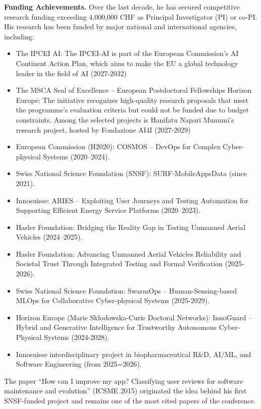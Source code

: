 \documentclass[11pt]{article}
\begin{document}
\medskip
\noindent
\textbf{Funding Achievements.}
Over the last decade, he has secured competitive research funding exceeding 4,000,000 CHF as Principal Investigator (PI) or co-PI. His research has been funded by major national and international agencies, including:

\begin{itemize}
\item The IPCEI AI: The IPCEI-AI is part of the European Commission's AI Continent Action Plan, which aims to make the EU a global technology leader in the field of AI (2027-2032) 
\item The MSCA Seal of Excellence – European Postdoctoral Fellowships Horizon Europe: The initiative recognizes high-quality research proposals that meet the programme’s evaluation criteria but could not be funded due to budget constraints. Among the selected projects is Hanifatu Napari Mumuni’s research project, hosted by Fondazione AI4I  (2027-2029) 
\item European Commission (H2020): COSMOS – DevOps for Complex Cyber-physical Systems (2020–2024).
\item Swiss National Science Foundation (SNSF): SURF-MobileAppsData (since 2021).
\item Innosuisse: ARIES – Exploiting User Journeys and Testing Automation for Supporting Efficient Energy Service Platforms (2020–2023).
\item Hasler Foundation: Bridging the Reality Gap in Testing Unmanned Aerial Vehicles (2024–2025).
\item Hasler Foundation: Advancing Unmanned Aerial Vehicles Reliability and Societal Trust Through Integrated Testing and Formal Verification (2025-2026).
\item Swiss National Science Foundation: SwarmOps – Human-Sensing-based MLOps for Collaborative Cyber-physical Systems (2025-2029).
\item Horizon Europe (Marie Skłodowska-Curie Doctoral Networks): InnoGuard – Hybrid and Generative Intelligence for Trustworthy Autonomous Cyber-Physical Systems (2024-2028).
\item Innosuisse interdisciplinary project in biopharmaceutical R\&D, AI/ML, and Software Engineering (from 2025=2026).
\end{itemize}

The paper ``How can I improve my app? Classifying user reviews for software maintenance and evolution'' (ICSME 2015) originated the idea behind his first SNSF-funded project and remains one of the most cited papers of the conference.
\end{document}
